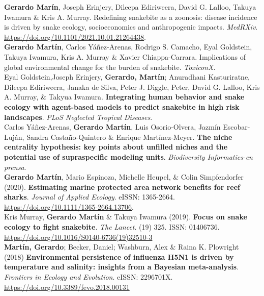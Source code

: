 \documentclass[11pt, letter]{article}
\newcommand{\years}[1]{\marginnote{\scriptsize #1}}
\begin{document}
\years{2021} \textbf{Gerardo Mar\'in}, Joseph Erinjery, Dileepa Ediriweera, David G. Lalloo, Takuya Iwamura \& Kris A. Murray. Redefining snakebite as a zoonosis: disease incidence is driven by snake ecology, socioeconomics and anthropogenic impacts. \emph{MedRXiv}. \url{https://doi.org/10.1101/2021.10.01.21264438}.\\

\years{2021} \textbf{Gerardo Martín}, Carlos Y\'a\~nez-Arenas, Rodrigo S. Camacho, Eyal Goldstein, Takuya Iwamura, Kris A. Murray \& Xavier Chiappa-Carrara. Implications of global environmental change for the burden of snakebite. \emph{ToxiconX}.\\

\years{2021} Eyal Goldstein,Joseph Erinjery, \textbf{Gerardo, Mart\'in}; Anuradhani Kasturiratne, Dileepa Ediriweera, Janaka de Silva, Peter J. Diggle, Peter, David G. Lalloo, Kris A. Murray, \& Takyua Iwamura. \textbf{Integrating human behavior and snake ecology with agent-based models to predict snakebite in high risk landscapes}. \emph{PLoS Neglected Tropical Diseases}.\\

\years{2020} Carlos Y\'a\~nez-Arenas, \textbf{Gerardo Mart\'in}, Luis Osorio-Olvera, Jazm\'in Escobar-Luj\'an, Sandra Casta\~no-Quintero \& Enrique Mart\'inez-Meyer. \textbf{The niche centrality hypothesis: key points about unfilled niches and the potential use of supraspecific modeling units}. \emph{Biodiversity Informatics}-\emph{en prensa}.\\

\years{2020} \textbf{Gerardo Mart\'in}, Mario Espinoza, Michelle Heupel, \& Colin Simpfendorfer (2020). \textbf{Estimating marine protected area network benefits for reef sharks}. \emph{Journal of Applied Ecology}. eISSN: 1365-2664. \url{https://doi.org/10.1111/1365-2664.13706}.\\

\years{2019} Kris Murray, \textbf{Gerardo Mart\'in} \& Takuya Iwamura (2019). \textbf{Focus on snake ecology to fight snakebite}. \emph{The Lancet}. (19) 325. ISSN: 01406736. \url{https://doi.org/10.1016/S0140-6736(19)32510-3}\\

\years{2018} \textbf{Mart\'in, Gerardo}; Becker, Daniel; Washburn, Alex \& Raina K. Plowright (2018) \textbf{Environmental persistence of influenza H5N1 is driven by temperature and salinity: insights from a Bayesian meta-analysis}. \emph{Frontiers in Ecology and Evolution}. eISSN: 2296701X. \url{https://doi.org/10.3389/fevo.2018.00131}\\
\end{document}

